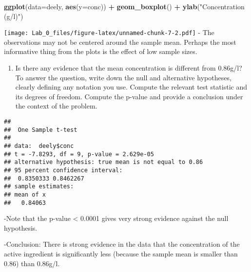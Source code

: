 \documentclass[]{article}
\newenvironment{Shaded}{\begin{snugshade}}{\end{snugshade}}
\newcommand{\KeywordTok}[1]{\textcolor[rgb]{0.13,0.29,0.53}{\textbf{#1}}}
\newcommand{\DataTypeTok}[1]{\textcolor[rgb]{0.13,0.29,0.53}{#1}}
\newcommand{\FloatTok}[1]{\textcolor[rgb]{0.00,0.00,0.81}{#1}}
\newcommand{\StringTok}[1]{\textcolor[rgb]{0.31,0.60,0.02}{#1}}
\newcommand{\OperatorTok}[1]{\textcolor[rgb]{0.81,0.36,0.00}{\textbf{#1}}}
\newcommand{\NormalTok}[1]{#1}
\providecommand{\tightlist}{%
  \setlength{\itemsep}{0pt}\setlength{\parskip}{0pt}}
\begin{document}
\begin{Shaded}
\begin{Highlighting}[]
\KeywordTok{ggplot}\NormalTok{(}\DataTypeTok{data=}\NormalTok{deely, }\KeywordTok{aes}\NormalTok{(}\DataTypeTok{y=}\NormalTok{conc)) }\OperatorTok{+}\StringTok{ }\KeywordTok{geom_boxplot}\NormalTok{() }\OperatorTok{+}\StringTok{ }\KeywordTok{ylab}\NormalTok{(}\StringTok{"Concentration (g/l)"}\NormalTok{)}
\end{Highlighting}
\end{Shaded}

\texttt{[image: Lab\_0\_files/figure-latex/unnamed-chunk-7-2.pdf]} - The
observations may not be centered around the sample mean. Perhaps the
most informative thing from the plots is the effect of low sample sizes.

\begin{enumerate}
\def\labelenumi{\alph{enumi})}
\setcounter{enumi}{2}
\tightlist
\item
  Is there any evidence that the mean concentration is different from
  0.86g/l? To answer the question, write down the null and alternative
  hypotheses, clearly defining any notation you use. Compute the
  relevant test statistic and its degrees of freedom. Compute the
  p-value and provide a conclusion under the context of the problem.
\end{enumerate}

\begin{Shaded}
\end{Shaded}

\begin{verbatim}
## 
##  One Sample t-test
## 
## data:  deely$conc
## t = -7.8293, df = 9, p-value = 2.629e-05
## alternative hypothesis: true mean is not equal to 0.86
## 95 percent confidence interval:
##  0.8350333 0.8462267
## sample estimates:
## mean of x 
##   0.84063
\end{verbatim}

-Note that the p-value \textless{} 0.0001 gives very strong evidence
against the null hypothesis.

-Conclusion: There is strong evidence in the data that the concentration
of the active ingredient is significantly less (because the sample mean
is smaller than 0.86) than 0.86g/l.
\end{document}
